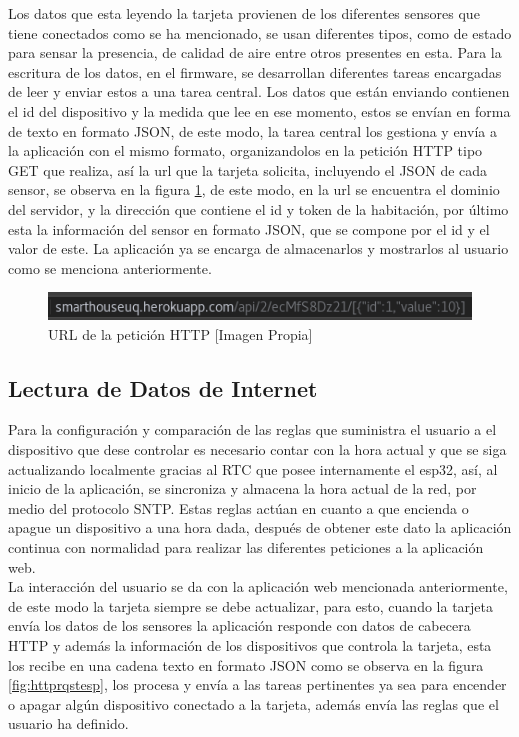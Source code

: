 Los datos que esta leyendo la tarjeta provienen de los diferentes sensores que tiene conectados como se ha mencionado, se usan diferentes tipos, como de estado para sensar la presencia, de calidad de aire entre otros presentes en esta. Para la escritura de los datos, en el firmware, se desarrollan diferentes tareas encargadas de leer y enviar estos a una tarea central. Los datos que están enviando contienen el id del dispositivo y la medida que lee en ese momento, estos se envían en forma de texto en formato JSON, de este modo, la tarea central los gestiona y envía a la aplicación con el mismo formato, organizandolos en la petición HTTP tipo GET que realiza, así la url que la tarjeta solicita, incluyendo el JSON de cada sensor, se observa en la figura \ref{fig:json}, de este modo, en la url se encuentra el dominio del servidor, y la dirección que contiene el id y token de la habitación, por último esta la información del sensor en formato JSON, que se compone por el id y el valor de este. La aplicación ya se encarga de almacenarlos y mostrarlos al usuario como se menciona anteriormente.

\begin{figure}[H]
	\centering
	\caption{URL de la petición HTTP [Imagen Propia]}
	\label{fig:json}
	\includegraphics[width=0.7\linewidth]{Imagenes/JSON}
\end{figure}


\subsection{Lectura de Datos de Internet}

Para la configuración y comparación de las reglas que suministra el usuario a el dispositivo que dese controlar es necesario contar con la hora actual y que se siga actualizando localmente gracias al RTC que posee internamente el esp32, así, al inicio de la aplicación, se sincroniza y almacena la hora actual de la red, por medio del protocolo SNTP. Estas reglas actúan en cuanto a que encienda o apague un dispositivo a una hora dada, después de obtener este dato la aplicación continua con normalidad para realizar las diferentes peticiones a la aplicación web.\\

La interacción del usuario se da con la aplicación web mencionada anteriormente, de este modo la tarjeta siempre se debe actualizar, para esto, cuando la tarjeta envía los datos de los sensores la aplicación responde con datos de cabecera HTTP y además la información de los dispositivos que controla la tarjeta, esta los recibe en una cadena texto en formato JSON como se observa en la figura \ref{fig:httprqstesp}, los procesa y envía a las tareas pertinentes ya sea para encender o apagar algún dispositivo conectado a la tarjeta, además envía las reglas que el usuario ha definido.

